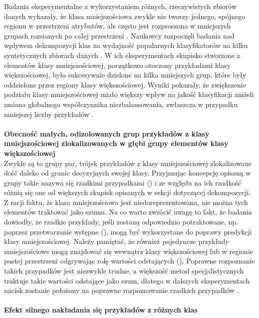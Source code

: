 \noindent Badania eksperymentalne z wykorzystaniem różnych, rzeczywistych zbiorów danych wykazały, że klasa mniejszościowa zwykle nie tworzy jednego, spójnego regionu w przestrzeni atrybutów, ale często jest rozproszona w mniejszych grupach rozsianych po całej przestrzeni \cite{Book:DataDistribution}\cite{Article:DataDistribution2}\cite{Inbook:DataDistribution}. Naukowcy rozpoczęli badania nad wpływem dekompozycji klas na wydajność popularnych klasyfikatorów na kilku syntetycznych zbiorach danych \cite{Article:DataDistribution}. W ich eksperymentach skupisko stworzone z elementów klasy mniejszościowej, początkowo otoczony przykładami klasy większościowej, było sukcesywnie dzielone na kilka mniejszych grup, które były oddzielone przez regiony klasy większościowej. Wyniki pokazały, że zwiększenie podziału klasy mniejszościowej miało większy wpływ na jakość klasyfikacji aniżeli zmiana globalnego współczynnika niezbalansowania, zwłaszcza w przypadku mniejszej liczby przykładów \cite{Article:TypyPrzykladow}.\\\\
\textbf{Obecność małych, odizolowanych grup przykładów z klasy mniejszościowej zlokalizowanych w głębi grupy elementów klasy większościowej}\\

\noindent Zwykle są to grupy par, trójek przykładów z klasy mniejszościowej zlokalizowane dość daleko od granic decyzyjnych swojej klasy. Przyjmując koncepcję opisaną w \cite{Article:DataDistribution3} grupy takie nazywa się rzadkimi przypadkami () i ze względu na ich rzadkość różnią się one od większych skupisk opisanych w sekcji dotyczącej dekompozycji. Z racji faktu, że klasa mniejszościowa jest niedoreprezentowana, nie można tych elementów traktować jako szumu. Na co warto zwrócić uwagę to fakt, że badania \cite{Article:DataDistribution2} dowiodły, że rzadkie przykłady, jeśli zostaną odpowiednio potraktowane, np. poprzez przetwarzanie wstępne (), mogą być wykorzystane do poprawy predykcji klasy mniejszościowej. Należy pamiętać, że również pojedyncze przykłady mniejszościowe mogą znajdować się wewnątrz klasy większościowej lub w regionie pustej przestrzeni odgrywając rolę wartości odstających (). Poprawne rozpoznanie takich przypadków jest niezwykle trudne, a większość metod specjalistycznych traktuje takie wartości odstające jako szum, dlatego w dalszych eksperymentach nacisk zostanie położony na poprawne rozpoznawanie rzadkich przypadków \cite{Article:TypyPrzykladow}.\\\\
\textbf{Efekt silnego nakładania się przykładów z różnych klas}\\


